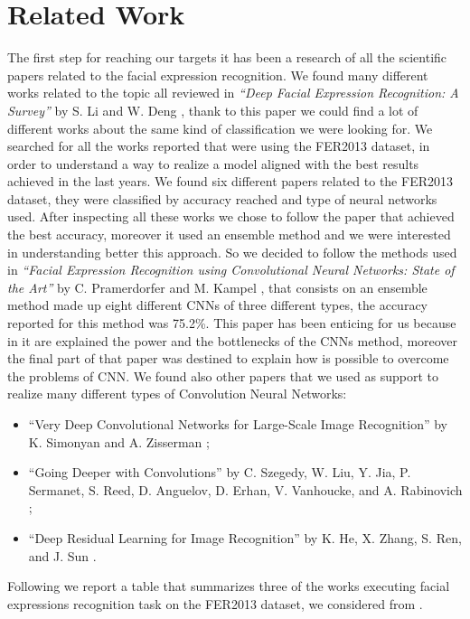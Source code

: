 \documentclass[10pt,twocolumn,letterpaper]{article}
\begin{document}
\section{Related Work}
The first step for reaching our targets it has been a research of all the scientific papers related to the facial expression recognition.
We found many different works related to the topic all reviewed in \textit{``Deep Facial Expression Recognition: A Survey''} by S. Li and W. Deng \cite{paper}, thank to this paper 
we could find a lot of different works about the same kind of classification we were looking for.
We searched for all the works reported that were using the FER2013 dataset, in order to understand a way to realize a model aligned with the best results achieved in the last years.
We found six different papers related to the FER2013 dataset, they were classified by accuracy reached and type of neural networks used. 
After inspecting all these works we chose to follow the paper that achieved the best accuracy, moreover it used an ensemble method and we were interested in understanding better this approach.
So we decided to follow the methods used in \textit{``Facial Expression Recognition using
Convolutional Neural Networks: State of the Art''} by C. Pramerdorfer and M. Kampel \cite{147}, that consists on an ensemble method made up eight different CNNs of three different types, the accuracy reported for this method was 75.2\%.
This paper has been enticing for us because in it are explained the power and the bottlenecks of the CNNs 
method, moreover the final part of that paper was destined to explain how is possible to overcome the problems of CNN.
We found also other papers that we used as support to realize many different types of Convolution Neural Networks:
\begin{itemize}
   \item ``Very Deep Convolutional Networks
   for Large-Scale Image Recognition'' by K. Simonyan and A. Zisserman \cite{24};
   \item ``Going Deeper with Convolutions'' by C. Szegedy, W. Liu, Y. Jia, P. Sermanet, S. Reed, D. Anguelov, D. Erhan,
   V. Vanhoucke, and A. Rabinovich \cite{13};
   \item ``Deep Residual Learning for Image Recognition'' by K. He, X. Zhang, S. Ren, and J. Sun \cite{5}.
\end{itemize}
Following we report a table that summarizes three of the works executing facial expressions 
recognition task on the FER2013 dataset, we considered from \cite{paper}. 
\end{document}

